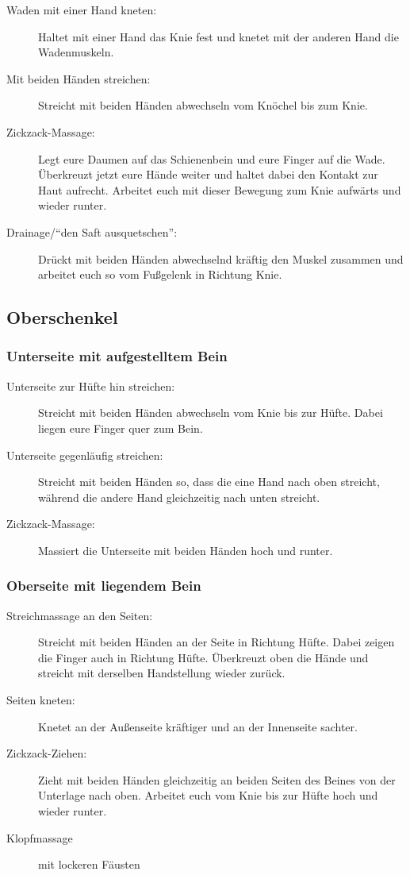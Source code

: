 \begin{description}
  \item [Waden mit einer Hand kneten:] Haltet mit einer Hand das Knie fest und knetet mit der anderen Hand die Wadenmuskeln.
  \item [Mit beiden Händen streichen:] Streicht mit beiden Händen abwechseln vom Knöchel bis zum Knie.
  \item [Zickzack-Massage:] Legt eure Daumen auf das Schienenbein und eure Finger auf die Wade. Überkreuzt jetzt eure Hände weiter und haltet dabei den Kontakt zur Haut aufrecht. Arbeitet euch mit dieser Bewegung zum Knie aufwärts und wieder runter.
  \item [Drainage/"`den Saft ausquetschen"':] Drückt mit beiden Händen abwechselnd kräftig den Muskel zusammen und arbeitet euch so vom Fußgelenk in Richtung Knie.
\end{description}

\subsection{Oberschenkel}

\subsubsection{Unterseite mit aufgestelltem Bein}

\begin{description}
  \item [Unterseite zur Hüfte hin streichen:] Streicht mit beiden Händen abwechseln vom Knie bis zur Hüfte. Dabei liegen eure Finger quer zum Bein.
  \item [Unterseite gegenläufig streichen:] Streicht mit beiden Händen so, dass die eine Hand nach oben streicht, während die andere Hand gleichzeitig nach unten streicht.
  \item [Zickzack-Massage:] Massiert die Unterseite mit beiden Händen hoch und runter.
\end{description}

\subsubsection{Oberseite mit liegendem Bein}

\begin{description}
  \item [Streichmassage an den Seiten:] Streicht mit beiden Händen an der Seite in Richtung Hüfte. Dabei zeigen die Finger auch in Richtung Hüfte. Überkreuzt oben die Hände und streicht mit derselben Handstellung wieder zurück.
  \item [Seiten kneten:] Knetet an der Außenseite kräftiger und an der Innenseite sachter.
  \item [Zickzack-Ziehen:] Zieht mit beiden Händen gleichzeitig an beiden Seiten des Beines von der Unterlage nach oben. Arbeitet euch vom Knie bis zur Hüfte hoch und wieder runter.
  \item [Klopfmassage] mit lockeren Fäusten
\end{description}


